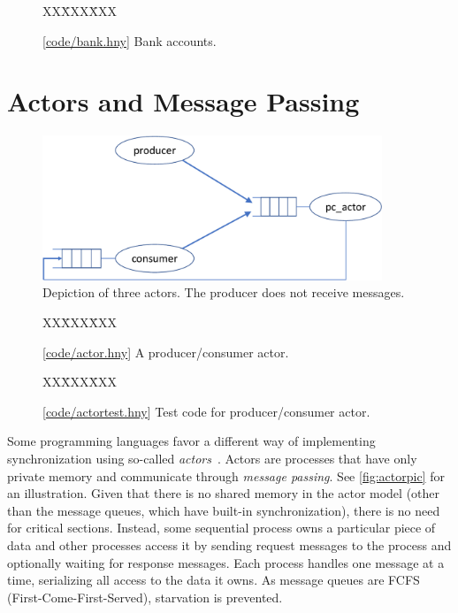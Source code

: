 \documentclass{report}
\newcommand{\harmonysource}[1]{
\begin{tabbing}
XX\=XXX\=XXX\kill
    
\end{tabbing}
}
\newcommand{\harmonylink}[1]{%
[\href{https://www.cs.cornell.edu/home/rvr/harmony/#1}{\underline{#1}}]%
}
\newenvironment{code}{
\tcolorbox
}{
\endtcolorbox
}
\begin{document}
\begin{figure}
\begin{code}
\harmonysource{bank}
\end{code}
\caption{\harmonylink{code/bank.hny} Bank accounts.}
\label{fig:bank}
\end{figure}

\chapter{Actors and Message Passing}
\label{ch:actor}
%
%

%

\begin{figure}
\begin{center}
\includegraphics[width=4in]{figures/actor-crop.pdf}
\end{center}
\caption{Depiction of three actors.  The producer does not receive messages.}
\label{fig:actorpic}
\end{figure}

\begin{figure}
\begin{code}
\harmonysource{actor}
\end{code}
\caption{\harmonylink{code/actor.hny} A producer/consumer actor.}
\label{fig:actor}
\end{figure}

\begin{figure}
\begin{code}
\harmonysource{actortest}
\end{code}
\caption{\harmonylink{code/actortest.hny} Test code for producer/consumer actor.}
\label{fig:actortest}
\end{figure}

Some programming languages favor a different way of implementing
synchronization using so-called \emph{actors}~\cite{HBS73}.  Actors are
processes that have only private memory and communicate through
\emph{message passing}.
See \autoref{fig:actorpic} for an illustration.
Given that there is no shared memory in the actor model (other than the message
queues, which have built-in synchronization), there is no need
for critical sections.  Instead, some sequential process owns a particular
piece of data and other processes access it by sending request messages
to the process and optionally waiting for response messages.  Each process
handles one message at a time, serializing all access to the data it owns.
As message queues are FCFS (First-Come-First-Served), starvation is prevented.
\end{document}
